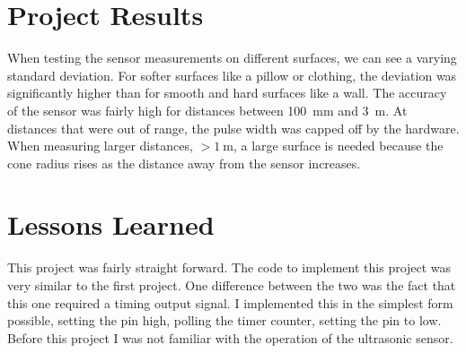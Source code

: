 \documentclass[CMPE]{KGCOEReport}
\begin{document}
    \section*{Project Results}

    When testing the sensor measurements on different surfaces, we can see a varying
    standard deviation. For softer surfaces like a pillow or clothing, the deviation
    was significantly higher than for smooth and hard surfaces like a wall. The accuracy
    of the sensor was fairly high for distances between \SI{100}{\milli\m} and \SI{3}{\m}.
    At distances that were out of range, the pulse width was capped off by the hardware.
    When measuring larger distances, $>\SI{1}{\m}$, a large surface is needed because the
    cone radius rises as the distance away from the sensor increases.

    \section*{Lessons Learned}

	This project was fairly straight forward. The code to implement this project was
	very similar to the first project. One difference between the two was the fact 
	that this one required a timing output signal. I implemented this in the simplest
	form possible, setting the pin high, polling the timer counter, setting the pin
	to low. Before this project I was not familiar with the operation of the ultrasonic
	sensor.
\end{document}
